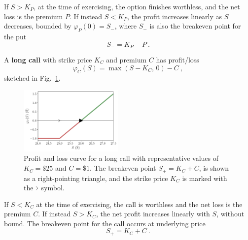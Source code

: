 \documentclass[aps,reprint]{revtex4-2}
\begin{document}
If $S > K_P$, at the time of exercising, the option finishes worthless,  and the net loss is the premium $P$. If instead $S<K_P$, the profit increases linearly as $S$ decreases, bounded by $\varphi_P(0) = S_-$, where 
$S_-$ is also the breakeven point for the put
\begin{equation}
S_- = K_P - P~.
\end{equation}


A \textbf{long call} with strike price $K_C$ and premium $C$ has profit/loss 
\begin{equation}
\varphi_C(S) = \max(S - K_C,\,0) - C~,
\end{equation}
sketched in Fig.~\ref{fig:call}.
\begin{figure}[hb]
    \centering
    \includegraphics[width=0.45\textwidth]{figs/call.pdf}
    \caption{Profit and loss curve for a long call with representative values of $K_C = \$25$ and $C = \$1$.  The breakeven point $S_+ = K_C + C$, is shown as a right-pointing triangle, and the strike price $K_C$ is marked with the $ \scalebox{0.5}[1]{$>$} $ symbol.
    }
    \label{fig:call}
\end{figure}

If $S < K_C$ at the time of exercising, the call is worthless and the net loss is the premium $C$. If instead $S>K_C$, the net profit increases
linearly with $S$, without bound. The breakeven point for the call occurs at underlying price
\begin{equation}
S_+ = K_C + C~.
\end{equation}
\end{document}

